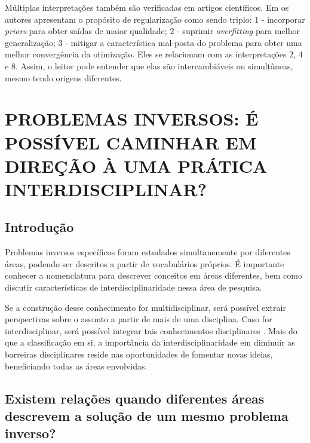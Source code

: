 Múltiplas interpretações também são verificadas em artigos científicos. Em \cite{Kaji2019} os autores apresentam o propósito de regularização como sendo triplo: 1 - incorporar \textit{priors} para obter saídas de maior qualidade; 2 - suprimir \textit{overfitting} para melhor generalização; 3 - mitigar a característica mal-posta do problema para obter uma melhor convergência da otimização. Eles se relacionam com as interpretações $2$, $4$ e $8$. Assim, o leitor pode entender que elas são intercambiáveis ou simultâneas, mesmo tendo origens diferentes. 


\newpage

\section{PROBLEMAS INVERSOS: É POSSÍVEL CAMINHAR EM DIREÇÃO À UMA PRÁTICA INTERDISCIPLINAR?}\label{sec:interdisciplinarity}

\subsection{Introdução}
Problemas inversos específicos foram estudados simultanemente por diferentes áreas, podendo ser descritos a partir de vocabulários próprios. É importante conhecer a nomenclatura para descrever conceitos em áreas diferentes, bem como discutir características de interdisciplinaridade nessa área de pesquisa.  

 Se a construção desse conhecimento for multidisciplinar, será possível extrair perspectivas sobre o assunto a partir de mais de uma disciplina. Caso for interdisciplinar, será possível integrar tais conhecimentos disciplinares  \cite[Capítulo 3]{Greef2017}. Mais do que a classificação em si, a importância da interdisciplinaridade em diminuir as barreiras disciplinares reside nas oportunidades de fomentar novas ideias, beneficiando todas as áreas envolvidas.



\subsection{Existem relações quando diferentes áreas descrevem a solução de um mesmo problema inverso?} 

